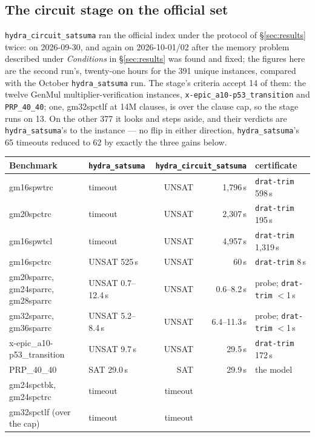 \documentclass[10pt]{article}
\begin{document}
\subsection{The circuit stage on the official set}
\label{sec:circuit-results}

\texttt{hydra\_circuit\_satsuma} ran the official index under the
protocol of \S\ref{sec:results} twice: on 2026-09-30, and again on
2026-10-01/02 after the memory problem described under
\emph{Conditions} in \S\ref{sec:results} was found and fixed; the
figures here are the second run's, twenty-one hours for the 391 unique
instances, compared with the October \texttt{hydra\_satsuma} run. The
stage's criteria accept 14 of them: the twelve GenMul
multiplier-verification instances, \texttt{x-epic\_a10-p53\_transition}
and \texttt{PRP\_40\_40}; one, gm32spctlf at 14M clauses, is over the
clause cap, so the stage runs on 13. On the other 377 it looks and steps
aside, and their verdicts are \texttt{hydra\_satsuma}'s to the
instance --- no flip in either direction, \texttt{hydra\_satsuma}'s 65
timeouts reduced to 62 by exactly the three gains below.

\begin{center}
\small
\begin{tabular}{@{}llrrl@{}}
\toprule
Benchmark & \texttt{hydra\_satsuma} & \multicolumn{2}{l}{\texttt{hydra\_circuit\_satsuma}} & certificate \\
\midrule
gm16spwtrc & timeout & UNSAT & 1{,}796\,s & \texttt{drat-trim} 598\,s \\
gm20spctrc & timeout & UNSAT & 2{,}307\,s & \texttt{drat-trim} 195\,s \\
gm16spwtcl & timeout & UNSAT & 4{,}957\,s & \texttt{drat-trim} 1{,}319\,s \\
gm16spctrc & UNSAT 525\,s & UNSAT & 60\,s & \texttt{drat-trim} 8\,s \\
gm20sparrc, gm24sparrc, gm28sparrc & UNSAT 0.7--12.4\,s & UNSAT & 0.6--8.2\,s & probe; \texttt{drat-trim} $<$1\,s \\
gm32sparrc, gm36sparrc & UNSAT 5.2--8.4\,s & UNSAT & 6.4--11.3\,s & probe; \texttt{drat-trim} $<$1\,s \\
x-epic\_a10-p53\_transition & UNSAT 9.7\,s & UNSAT & 29.5\,s & \texttt{drat-trim} 172\,s \\
PRP\_40\_40 & SAT 29.0\,s & SAT & 29.9\,s & the model \\
gm24spctbk, gm24spctrc & timeout & timeout & & \\
gm32spctlf (over the cap) & timeout & timeout & & \\
\bottomrule
\end{tabular}
\end{center}
\end{document}
